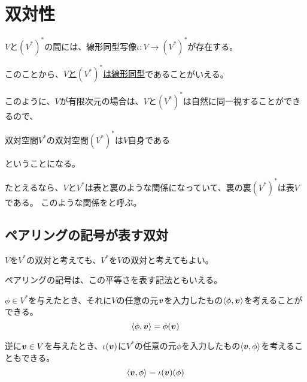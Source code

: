 \documentclass[../../../topic_linear-algebra]{subfiles}
\begin{document}
\sectionline
\section{双対性}

\begin{mindflow}
\end{mindflow}

$V$と$(V^*)^*$の間には、線形同型写像$\iota \colon V \to (V^*)^*$が存在する。

このことから、\hyperref[def:linear-subspace-isomorphism]{$V$と$(V^*)^*$は線形同型}であることがいえる。

\br

このように、$V$が有限次元の場合は、$V$と$(V^*)^*$は自然に同一視することができるので、
\begin{emphabox}
  \begin{spacebox}
    \begin{center}
      双対空間$V^*$の双対空間$(V^*)^*$は$V$自身である
    \end{center}
  \end{spacebox}
\end{emphabox}
ということになる。

\br

たとえるなら、$V$と$V^*$は表と裏のような関係になっていて、裏の裏$(V^*)^*$は表$V$である。
このような関係をと呼ぶ。

\subsection{ペアリングの記号が表す双対}

$V$を$V^*$の双対と考えても、$V^*$を$V$の双対と考えてもよい。

ペアリングの記号は、この平等さを表す記法ともいえる。

\br

$\phi \in V^*$を与えたとき、それに$V$の任意の元$\vb*{v}$を入力したもの$\langle \phi, \vb*{v} \rangle$を考えることができる。
\begin{equation*}
  \langle \phi, \vb*{v} \rangle = \phi(\vb*{v})
\end{equation*}

逆に$\vb*{v} \in V$を与えたとき、$\iota(\vb*{v})$に$V^*$の任意の元$\phi$を入力したもの$\langle \vb*{v}, \phi \rangle$を考えることもできる。
\begin{equation*}
  \langle \vb*{v}, \phi \rangle = \iota(\vb*{v})(\phi)
\end{equation*}
\end{document}
